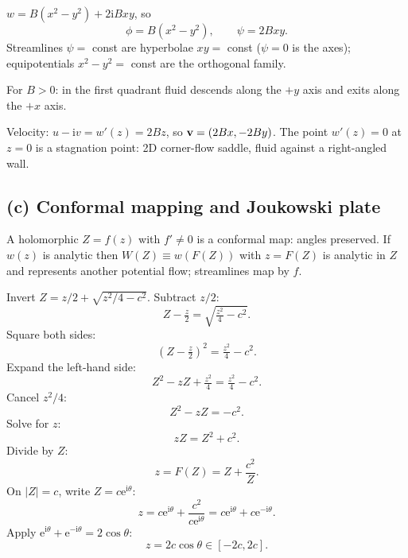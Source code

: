 \documentclass[11pt]{article}
\begin{document}
$w = B(x^2-y^2) + 2\mathrm{i}Bxy$, so
\begin{equation}
\boxed{\;\phi = B(x^2-y^2),\qquad \psi = 2Bxy.\;}
\end{equation}
Streamlines $\psi=$ const are hyperbolae $xy=$ const ($\psi=0$ is the axes); equipotentials $x^2-y^2=$ const are the orthogonal family.
\begin{center}
\end{center}
For $B>0$: in the first quadrant fluid descends along the $+y$ axis and exits along the $+x$ axis.

Velocity: $u-\mathrm{i}v = w'(z) = 2Bz$, so $\vb v = (2Bx,-2By)$. The point $w'(z)=0$ at $z=0$ is a stagnation point: 2D corner-flow saddle, fluid against a right-angled wall.

\subsection*{(c) Conformal mapping and Joukowski plate}

A holomorphic $Z=f(z)$ with $f'\ne 0$ is a conformal map: angles preserved. If $w(z)$ is analytic then $W(Z)\equiv w(F(Z))$ with $z=F(Z)$ is analytic in $Z$ and represents another potential flow; streamlines map by $f$.

Invert $Z = z/2 + \sqrt{z^2/4-c^2}$. Subtract $z/2$:
\[ Z - \tfrac{z}{2} = \sqrt{\tfrac{z^2}{4}-c^2}. \]
Square both sides:
\[ \left(Z-\tfrac{z}{2}\right)^2 = \tfrac{z^2}{4}-c^2. \]
Expand the left-hand side:
\[ Z^2 - zZ + \tfrac{z^2}{4} = \tfrac{z^2}{4}-c^2. \]
Cancel $z^2/4$:
\[ Z^2 - zZ = -c^2. \]
Solve for $z$:
\[ zZ = Z^2 + c^2. \]
Divide by $Z$:
\begin{equation}
\boxed{\;z = F(Z) = Z + \frac{c^2}{Z}.\;}
\end{equation}
On $|Z|=c$, write $Z=c\mathrm{e}^{\mathrm{i}\theta}$:
\[ z = c\mathrm{e}^{\mathrm{i}\theta} + \frac{c^2}{c\mathrm{e}^{\mathrm{i}\theta}} = c\mathrm{e}^{\mathrm{i}\theta} + c\mathrm{e}^{-\mathrm{i}\theta}. \]
Apply $\mathrm{e}^{\mathrm{i}\theta}+\mathrm{e}^{-\mathrm{i}\theta}=2\cos\theta$:
\[ z = 2c\cos\theta \in [-2c,2c]. \]
\end{document}
